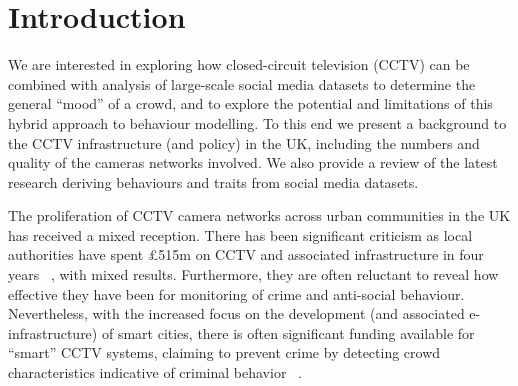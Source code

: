 \documentclass[conference]{IEEEtran}
\begin{document}
\section{Introduction}

We are interested in exploring how closed-circuit television (CCTV)
can be combined with analysis of large-scale social media datasets to
determine the general ``mood'' of a crowd, and to explore the
potential and limitations of this hybrid approach to behaviour
modelling. To this end we present a background to the CCTV
infrastructure (and policy) in the UK, including the numbers and
quality of the cameras networks involved. We also provide a review of
the latest research deriving behaviours and traits from social media
datasets.

The proliferation of CCTV camera networks across urban communities in
the UK has received a mixed reception. There has been significant
criticism as local authorities have spent \pounds515m on CCTV and associated
infrastructure in four years ~\cite{bbw:2012}, with mixed
results. Furthermore, they are often reluctant to reveal how effective
they have been for monitoring of crime and anti-social behaviour. 
Nevertheless, with the increased focus on the development (and
associated e-infrastructure) of smart cities, there is often
significant funding available for ``smart'' CCTV systems, claiming to
prevent crime by detecting crowd characteristics indicative of
criminal behavior ~\cite{welsh+farrington:2009,dibella-et-al:2014}.








\end{document}
